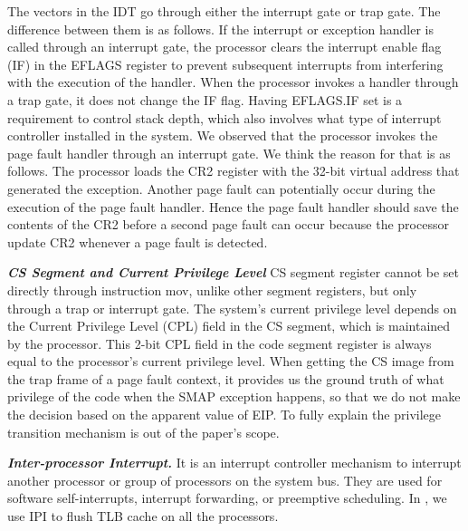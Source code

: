 The vectors in the IDT go through either the interrupt gate or trap gate. The difference between them is as follows. If the interrupt or exception handler is called through an interrupt gate, the processor clears the interrupt enable flag (IF) in the EFLAGS register to prevent subsequent interrupts from interfering with the execution of the handler.  When the processor invokes a handler through a trap gate, it does not change the IF flag. Having EFLAGS.IF set is a requirement to control stack depth, which also involves what type of interrupt controller installed in the system. We observed that the processor invokes the page fault handler through an interrupt gate. We think the reason for that is as follows. The processor loads the CR2 register with the 32-bit virtual address that generated the exception. Another page fault can potentially occur during the execution of the page fault handler. Hence the page fault handler should save the contents of the CR2 before a second page fault can occur because the processor update CR2 whenever a page fault is detected.

\textbf{\textit{CS Segment and Current Privilege Level}} CS segment register cannot be set directly through instruction mov, unlike other segment registers,  but only through a trap or interrupt gate. The system's current privilege level depends on the Current Privilege Level (CPL) field in the CS segment, which is maintained by the processor. This 2-bit CPL field in the code segment register is always equal to the processor's current privilege level. When getting the CS image from the trap frame of a page fault context, it provides us the ground truth of what privilege of the code when the SMAP exception happens, so that we do not make the decision based on the apparent value of EIP. To fully explain the privilege transition mechanism is out of the paper's scope.

\textbf{\textit{Inter-processor Interrupt.}}  It is an interrupt controller mechanism to interrupt another processor or group of processors on the system bus. They are used for software self-interrupts, interrupt forwarding, or preemptive scheduling. In \name, we use IPI to flush TLB cache on all the processors.

